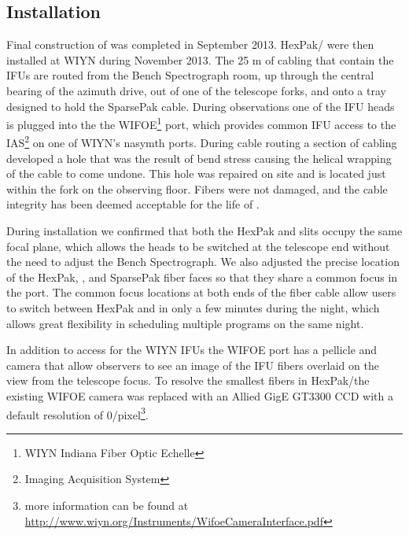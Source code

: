 \subsection{Installation}
\label{891_1:sec:install}

Final construction of \GP was completed in September 2013.  HexPak/\GP
were then installed at WIYN during November 2013. The 25 m of cabling
that contain the IFUs are routed from the Bench Spectrograph room, up
through the central bearing of the azimuth drive, out of one of the
telescope forks, and onto a tray designed to hold the SparsePak
cable. During observations one of the IFU heads is plugged into the
the WIFOE\footnote{WIYN Indiana Fiber Optic Echelle} port, which
provides common IFU access to the IAS\footnote{Imaging Acquisition
  System} on one of WIYN's nasymth ports. During cable routing a
section of cabling developed a hole that was the result of bend stress
causing the helical wrapping of the cable to come undone. This hole
was repaired on site and is located just within the fork on the
observing floor. Fibers were not damaged, and the cable integrity has
been deemed acceptable for the life of \GP.

During installation we confirmed that both the HexPak and \GP slits
occupy the same focal plane, which allows the heads to be switched at
the telescope end without the need to adjust the Bench Spectrograph.
We also adjusted the precise location of the HexPak, \GP, and
SparsePak \citep{Bershady05} fiber faces so that they share a common
focus in the port. The common focus locations at both ends of the
fiber cable allow users to switch between HexPak and \GP in only a few
minutes during the night, which allows great flexibility in scheduling
multiple programs on the same night.

In addition to access for the WIYN IFUs the WIFOE port has a pellicle
and camera that allow observers to see an image of the IFU fibers
overlaid on the view from the telescope focus. To resolve the smallest
fibers in HexPak/\GP the existing WIFOE camera was replaced with an
Allied GigE GT3300 CCD with a default resolution of
0/pixel\footnote{more information can be found at
  \url{http://www.wiyn.org/Instruments/WifoeCameraInterface.pdf}}.
